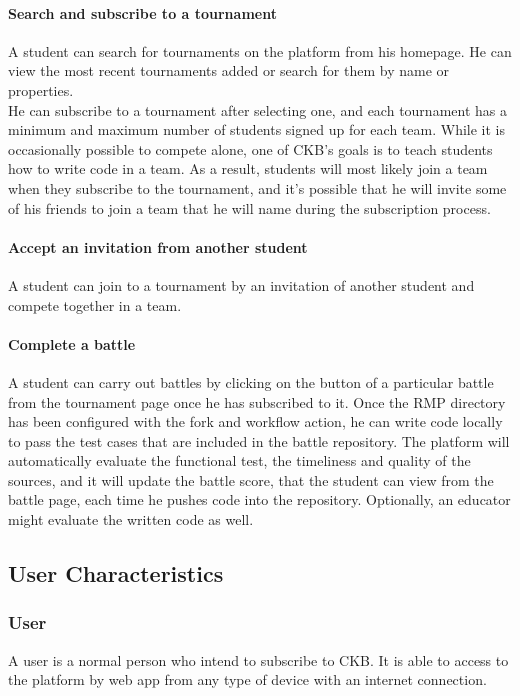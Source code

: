 \paragraph{Search and subscribe to a tournament}
A student can search for tournaments on the platform from his homepage. He can view the most recent tournaments added or search for them by name or properties.\\
He can subscribe to a tournament after selecting one, and each tournament has a minimum and maximum number of students signed up for each team. While it is occasionally possible to compete alone, one of CKB's goals is to teach 
students how to write code in a team. As a result, students will most likely join a team when they subscribe to the tournament, and it's possible that he will invite some of his friends to join a team that he will name during the 
subscription process.

\paragraph{Accept an invitation from another student}
A student can join to a tournament by an invitation of another student and compete together in a team.

\paragraph{Complete a battle}
A student can carry out battles by clicking on the button of a particular battle from the tournament page once he has subscribed to it. Once the RMP directory has been configured with the fork and workflow action, he can write code 
locally to pass the test cases that are included in the battle repository. The platform will automatically evaluate the functional test, the timeliness and quality of the sources, and it will update the battle score, that the student 
can view from the battle page, each time he pushes code into the repository. Optionally, an educator might evaluate the written code as well.
\subsection{User Characteristics}

\subsubsection{User}
A user is a normal person who intend to subscribe to CKB. It is able to access to the platform by web app from any type of device with an internet connection.

